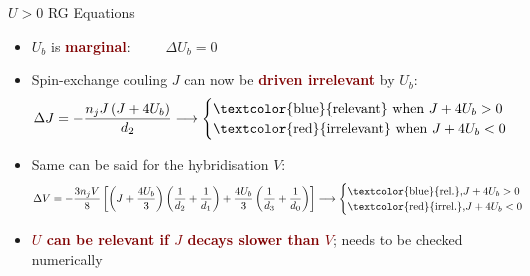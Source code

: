 \documentclass[aspectratio=169]{beamer}
\newcommand{\focus}[1]{\textcolor{maroon}{\textbf{#1}}}
\begin{document}
\begin{frame}[noframenumbering]{\(U > 0\) RG Equations}

\begin{itemize}[<+->]
	\item \(U_b\) is \focus{marginal}: ~ ~ ~\(\Delta U_b = 0\)
	\item Spin-exchange couling \(J\) can now be \focus{driven irrelevant} by \(U_b\): 
	\begin{equation*}
	\Delta J = -\frac{n_j J\left(J + 4U_b\right)}{d_2} \longrightarrow \begin{cases}
	\text{\textcolor{blue}{relevant} when }J+4U_b > 0\\
	\text{\textcolor{red}{irrelevant} when }J+4U_b < 0\\
	\end{cases}
	\end{equation*}
	\item Same can be said for the hybridisation \(V\):
	\begin{equation*}
	\Delta V = -\frac{3n_j V}{8}\left[\left(J + \frac{4U_b}{3}\right) \left(\frac{1}{d_2} + \frac{1}{d_1}\right) + \frac{4U_b}{3}\left(\frac{1}{d_3} + \frac{1}{d_0}\right)\right] \longrightarrow \begin{cases}
	\text{\textcolor{blue}{rel.},}J+4U_b > 0\\
	\text{\textcolor{red}{irrel.},}J+4U_b < 0\\
	\end{cases}
	\end{equation*}
	\item \focus{\(U\) can be relevant if \(J\) decays slower than \(V\)}; needs to be checked numerically
\end{itemize}
\end{frame}
\end{document}
